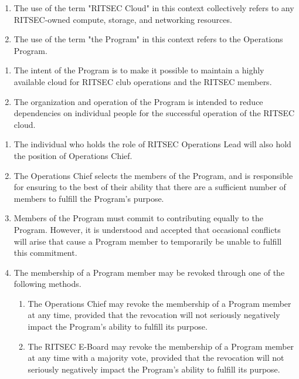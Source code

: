 

\begin{enumerate}
    \item The use of the term "RITSEC Cloud" in this context collectively
        refers to any RITSEC-owned compute, storage, and networking resources.
    \item The use of the term "the Program" in this context refers to the
        Operations Program.
\end{enumerate}


\begin{enumerate}
    \item The intent of the Program is to make it possible to maintain a highly
        available cloud for RITSEC club operations and the RITSEC members.
    \item The organization and operation of the Program is intended to reduce
        dependencies on individual people for the successful operation of the
        RITSEC cloud.
\end{enumerate}


\begin{enumerate}
    \item The individual who holds the role of RITSEC Operations Lead will also
        hold the position of Operations Chief.
    \item The Operations Chief selects the members of the Program, and is
        responsible for ensuring to the best of their ability that there are a
        sufficient number of members to fulfill the Program's purpose.
    \item Members of the Program must commit to contributing equally to the
        Program. However, it is understood and accepted that occasional
        conflicts will arise that cause a Program member to temporarily be
        unable to fulfill this commitment.
    \item The membership of a Program member may be revoked through one of the
        following methods.
    \begin{enumerate}
        \item The Operations Chief may revoke the membership of a Program
            member at any time, provided that the revocation will not seriously
            negatively impact the Program's ability to fulfill its purpose.
        \item The RITSEC E-Board may revoke the membership of a Program member
            at any time with a majority vote, provided that the revocation will
            not seriously negatively impact the Program's ability to fulfill
            its purpose.
    \end{enumerate}
\end{enumerate}

